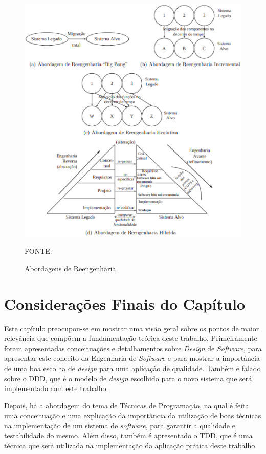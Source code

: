 \begin{figure}[h]
	\centering
	\caption{Abordagens de Reengenharia}
	\includegraphics[keepaspectratio=true,scale=0.7]{figuras/abordagens-reengenharia.eps}
    \parbox{\linewidth}{\centering FONTE: \cite{cagnin2005parfait}}
	\label{figReengenharia}
\end{figure}

\section{Considerações Finais do Capítulo}
\label{sectionConsideracoes}

Este capítulo preocupou-se em mostrar uma visão geral sobre os pontos de maior relevância que compõem a fundamentação teórica 
deste trabalho. Primeiramente foram apresentadas conceituações e detalhamentos sobre \textit{Design} de \textit{Software}, para apresentar este 
conceito da Engenharia de \textit{Software} e para mostrar a importância de uma boa escolha de \textit{design} para uma aplicação de qualidade. 
Também é falado sobre o DDD, que é o modelo de \textit{design} escolhido para o novo sistema que será implementado com este trabalho.

Depois, há a abordagem do tema de Técnicas de Programação, na qual é feita uma conceituação e uma explicação da importância da 
utilização de boas técnicas na implementação de um sistema de \textit{software}, para garantir a qualidade e testabilidade do mesmo. 
Além disso, também é apresentado o TDD, que é uma técnica que será utilizada na implementação da aplicação prática deste trabalho.

